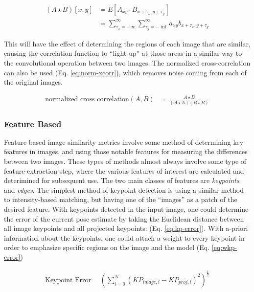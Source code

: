 \begin{equation}
    \begin{aligned}
        (A \star B)[x,y] &= E[A_{xy} \cdot B_{x + \tau_x,y+\tau_y}] \\
        &= \sum_{\tau_x=-\infty}^{\infty}\sum_{\tau_y=-\inf}^{\infty}a_{xy}b_{x + \tau_x,y + \tau_y}
    \end{aligned}
    \label{eq:xcorr}
\end{equation}

This will have the effect of determining the regions of each image that are similar, causing the correlation function to ``light up'' at those areas in a similar way to the convolutional operation between two images. The normalized cross-correlation can also be used (Eq. \ref{eq:norm-xcorr}), which removes noise coming from each of the original images.

\begin{equation}
    \begin{aligned}
        \text{normalized cross correlation}(A,B) &= \frac{A \star B}{(A \star A)(B \star B)}
    \end{aligned}\label{eq:norm-xcorr}
\end{equation}

\subsubsection{Feature Based}
Feature based image similarity metrics involve some method of determining key features in images, and using those notable features for measuring the differences between two images. These types of methods almost always involve some type of feature-extraction step, where the various features of interest are calculated and deterimined for subsequent use. The two main classes of features are \emph{keypoints} and \emph{edges}. The simplest method of keypoint detection is using a similar method to intensity-based matching, but having one of the ``images'' as a patch of the desired feature. With keypoints detected in the input image, one could determine the error of the current pose estimate by taking the Euclidean distance between all image keypoints and all projected keypoints: \cite{burtonAutomaticTrackingHealthy2021} (Eq. \ref{eq:kp-error}). With a-priori information about the keypoints, one could attach a weight to every keypoint in order to emphasize specific regions on the image and the model (Eq. \ref{eq:wkp-error})

\begin{equation}
    \begin{aligned}
        \text{Keypoint Error}= (\sum_{i = 0}^{N}(KP_{image,i} - KP_{proj,i})^2)^{\frac{1}{2}}
    \end{aligned}
    \label{eq:kp-error}
\end{equation}

